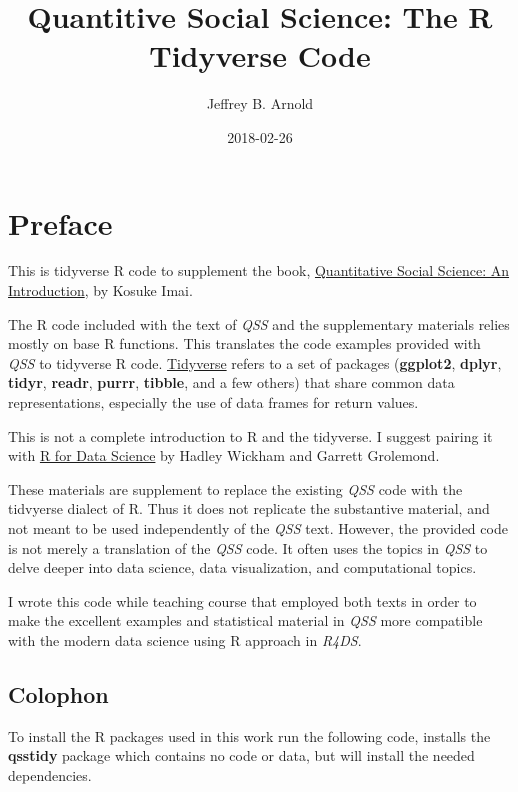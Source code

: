 \documentclass[]{book}
\title{Quantitive Social Science: The R Tidyverse Code}
\author{Jeffrey B. Arnold}
\date{2018-02-26}
\theoremstyle{definition}
\theoremstyle{definition}
\theoremstyle{definition}
\theoremstyle{remark}
\begin{document}
\maketitle

{
\setcounter{tocdepth}{1}
\tableofcontents
}
\hypertarget{preface}{%
\chapter*{Preface}\label{preface}}

This is tidyverse R code to supplement the book,
\href{http://press.princeton.edu/titles/11025.html}{Quantitative Social
Science: An Introduction}, by Kosuke Imai.

The R code included with the text of \emph{QSS} and the supplementary
materials relies mostly on base R functions. This translates the code
examples provided with \emph{QSS} to tidyverse R code.
\href{https://github.com/tidyverse/tidyverse}{Tidyverse} refers to a set
of packages (\textbf{ggplot2}, \textbf{dplyr}, \textbf{tidyr},
\textbf{readr}, \textbf{purrr}, \textbf{tibble}, and a few others) that
share common data representations, especially the use of data frames for
return values.

This is not a complete introduction to R and the tidyverse. I suggest
pairing it with \href{http://r4ds.had.co.nz/}{R for Data Science} by
Hadley Wickham and Garrett Grolemond.

These materials are supplement to replace the existing \emph{QSS} code
with the tidvyerse dialect of R. Thus it does not replicate the
substantive material, and not meant to be used independently of the
\emph{QSS} text. However, the provided code is not merely a translation
of the \emph{QSS} code. It often uses the topics in \emph{QSS} to delve
deeper into data science, data visualization, and computational topics.

I wrote this code while teaching course that employed both texts in
order to make the excellent examples and statistical material in
\emph{QSS} more compatible with the modern data science using R approach
in \emph{R4DS}.

\hypertarget{colophon}{%
\section*{Colophon}\label{colophon}}

To install the R packages used in this work run the following code,
installs the \textbf{qsstidy} package which contains no code or data,
but will install the needed dependencies.
\end{document}
